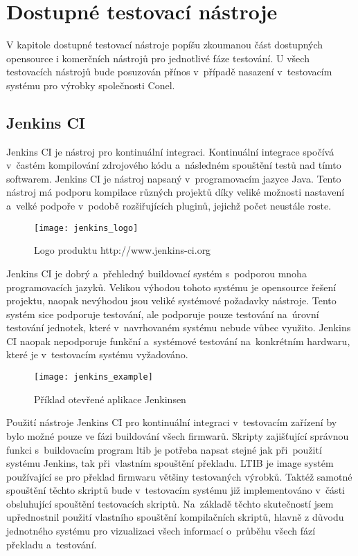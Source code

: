 \chapter{Dostupné testovací nástroje}
V kapitole dostupné testovací nástroje popíšu zkoumanou část dostupných opensource i komerčních nástrojů pro jednotlivé fáze testování. U všech testovacích nástrojů bude posuzován přínos v~případě nasazení v~testovacím systému pro výrobky společnosti Conel.

\section{Jenkins CI}
Jenkins CI je nástroj pro kontinuální integraci. Kontinuální integrace spočívá v~častém kompilování zdrojového kódu a~následném spouštění testů nad tímto softwarem.
Jenkins CI je nástroj napsaný v~programovacím jazyce Java. Tento nástroj má podporu  kompilace různých projektů díky veliké možnosti nastavení a~velké podpoře v~podobě rozšiřujících pluginů, jejichž počet neustále roste.

\begin{figure}[h]
  \centering
  \texttt{[image: jenkins\_logo]}
  \caption{Logo produktu http://www.jenkins-ci.org}
  \label{fig:testlink_logo}
\end{figure}

Jenkins CI je dobrý a~přehledný buildovací systém s~podporou mnoha programovacích jazyků. Velikou výhodou tohoto systému je opensource řešení projektu, naopak nevýhodou jsou veliké systémové požadavky nástroje. Tento systém sice podporuje testování, ale podporuje pouze testování na~úrovní testování jednotek, které v~navrhovaném systému nebude vůbec využito. Jenkins CI naopak nepodporuje funkční a~systémové testování na~konkrétním hardwaru, které je v~testovacím systému vyžadováno.

\begin{figure}[h]
  \centering
  \texttt{[image: jenkins\_example]}
  \caption{Příklad otevřené aplikace Jenkinsen}
  \label{fig:testlink_example}
\end{figure}

Použití nástroje Jenkins CI pro kontinuální integraci v~testovacím zařízení by bylo možné pouze ve fázi buildování všech firmwarů. Skripty zajišťující správnou funkci s~buildovacím program ltib je potřeba napsat stejné jak při~použití systému Jenkins, tak při~vlastním spouštění překladu. LTIB je image systém používající se pro překlad firmwaru většiny testovaných výrobků. Taktéž samotné spouštění těchto skriptů bude v~testovacím systému již implementováno v~části obsluhující spouštění testovacích skriptů. Na~základě těchto skutečností jsem upřednostnil použití vlastního spouštění kompilačních skriptů, hlavně z důvodu jednotného systému pro vizualizaci všech informací o~průběhu všech fází překladu a~testování.

